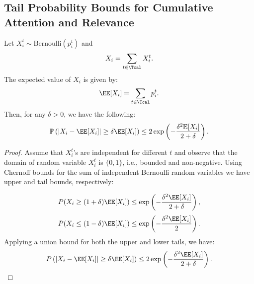 \subsection{Tail Probability Bounds for Cumulative Attention and Relevance}
\begin{theorem}
Let $X_i^t \sim \text{Bernoulli}(p_i^t)$ and
\[
    X_i = \sum_{t\in \Tcal} X_i^t.
\]
The expected value of $X_i$ is given by:
\[
    \EE[X_i] = \sum_{t\in \Tcal} p_i^t.
\]
\vspace{1em}
Then, for any $\delta > 0$, we have the following:
\[
    \mathbb{P}\left(|X_i - \EE[X_i]| \geq \delta \EE[X_i]\right) \leq 2\exp\left(-\frac{\delta^2 \mathbb{E}[X_i]}{2 + \delta}\right).
\]
\end{theorem}
\begin{proof}
    Assume that $X_i^t$'s are independent for different $t$ and observe that the domain of random variable $X_i^t$ is $\{0, 1\}$, i.e., bounded and non-negative. Using Chernoff bounds for the sum of independent Bernoulli random variables we have upper and tail bounds, respectively:

    \[
        P(X_i \geq (1 + \delta)\EE[X_i]) \leq \exp\left(-\frac{\delta^2 \EE[X_i] }{2 + \delta}\right),
    \]
    \[
        P(X_i \leq (1 - \delta)\EE[X_i]) \leq \exp\left(-\frac{\delta^2 \EE[X_i]}{2}\right).
    \]
    Applying a union bound for both the upper and lower tails, we have:
    \[
        P\left(|X_i - \EE[X_i] | \geq \delta \EE[X_i]\right) \leq 2 \exp\left(-\frac{\delta^2 \EE[X_i]}{2 + \delta}\right).
\]
\end{proof}
